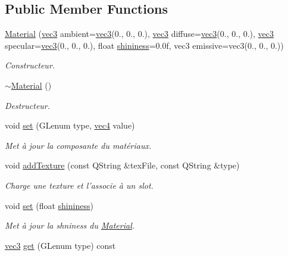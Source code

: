 \subsection*{Public Member Functions}
\begin{DoxyCompactItemize}
\item 
\hyperlink{class_material_a1692495b8e704a0ab17701365eb34b0f}{Material} (\hyperlink{structvec3}{vec3} ambient=\hyperlink{structvec3}{vec3}(0., 0., 0.), \hyperlink{structvec3}{vec3} diffuse=\hyperlink{structvec3}{vec3}(0., 0., 0.), \hyperlink{structvec3}{vec3} specular=\hyperlink{structvec3}{vec3}(0., 0., 0.), float \hyperlink{class_material_a9a938aa96f0d5a5dc4d17d43cfd4b42b}{shininess}=0.\+0f, vec3 emissive=vec3(0., 0., 0.))
\begin{DoxyCompactList}\small\item\em Constructeur. \end{DoxyCompactList}\item 
\hyperlink{class_material_a2c19452d71f54075df8f5405b03129f4}{$\sim$\+Material} ()
\begin{DoxyCompactList}\small\item\em Destructeur. \end{DoxyCompactList}\item 
void \hyperlink{class_material_a2ab92e03d9c90294cd28fff9b6a8cde0}{set} (G\+Lenum type, \hyperlink{structvec4}{vec4} value)
\begin{DoxyCompactList}\small\item\em Met à jour la composante du matériaux. \end{DoxyCompactList}\item 
void \hyperlink{class_material_a4f2227a6fb3f12c8618e399f93ab492c}{add\+Texture} (const Q\+String \&tex\+File, const Q\+String \&type)
\begin{DoxyCompactList}\small\item\em Charge une texture et l'associe à un slot. \end{DoxyCompactList}\item 
void \hyperlink{class_material_a3de47a95f13dc6f6306493516814762c}{set} (float \hyperlink{class_material_a9a938aa96f0d5a5dc4d17d43cfd4b42b}{shininess})
\begin{DoxyCompactList}\small\item\em Met à jour la shniness du \hyperlink{class_material}{Material}. \end{DoxyCompactList}\item 
\hyperlink{structvec3}{vec3} \hyperlink{class_material_a6b4b32cf23cbba3988becd840471a51c}{get} (G\+Lenum type) const 

\end{DoxyCompactItemize}
